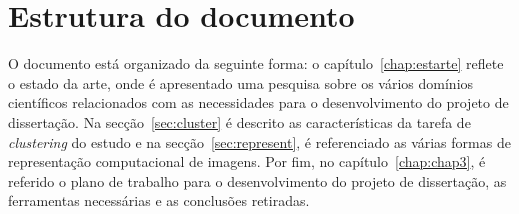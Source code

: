  

\section{Estrutura do documento} \label{sec:struct}

O documento está organizado da seguinte forma: o capítulo~\ref{chap:estarte} reflete o estado da arte, onde é apresentado uma pesquisa sobre os vários domínios científicos relacionados com as necessidades para o desenvolvimento do projeto de dissertação. Na secção~\ref{sec:cluster} é descrito as características da tarefa de \textit{clustering} do estudo e na secção~\ref{sec:represent}, é referenciado as várias formas de representação computacional de imagens.
Por fim, no capítulo~\ref{chap:chap3}, é referido o plano de trabalho para o desenvolvimento do projeto de dissertação, as ferramentas necessárias e as conclusões retiradas.

 

